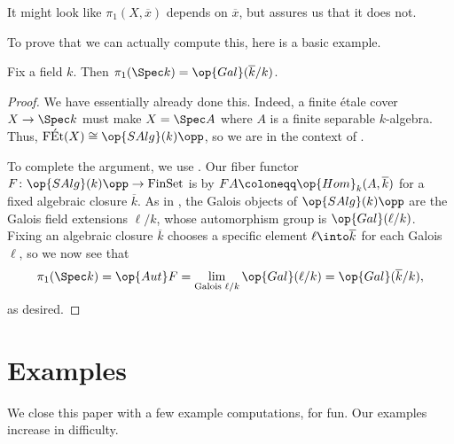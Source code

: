 \documentclass{amsart}
\begin{document}
\begin{remark}
    It might look like $\pi_1(X,\overline x)$ depends on $\overline x$, but  assures us that it does not.
\end{remark}
To prove that we can actually compute this, here is a basic example.
\begin{example}
    Fix a field $k$. Then $\pi_1(\Spec k)=\op{Gal}(\overline k/k)$.
\end{example}
\begin{proof}
    We have essentially already done this. Indeed, a finite \'etale cover $X\to\Spec k$ must make $X=\Spec A$ where $A$ is a finite separable $k$-algebra. Thus, $\mathrm{F\acute Et}(X)\cong\op{SAlg}(k)\opp$, so we are in the context of .

    To complete the argument, we use . Our fiber functor $F\colon\op{SAlg}(k)\opp\to\mathrm{FinSet}$ is by $FA\coloneqq\op{Hom}_k(A,\overline k)$ for a fixed algebraic closure $\overline k$. As in , the Galois objects of $\op{SAlg}(k)\opp$ are the Galois field extensions $\ell/k$, whose automorphism group is $\op{Gal}(\ell/k)$. Fixing an algebraic closure $\overline k$ chooses a specific element $\ell\into\overline k$ for each Galois $\ell$, so we now see that
    \[\pi_1(\Spec k)=\op{Aut}F=\lim_{\text{Galois }\ell/k}\op{Gal}(\ell/k)=\op{Gal}(\overline k/k),\]
    as desired.
\end{proof}

\section{Examples} \label{sec:examples}
We close this paper with a few example computations, for fun. Our examples increase in difficulty.
\end{document}
